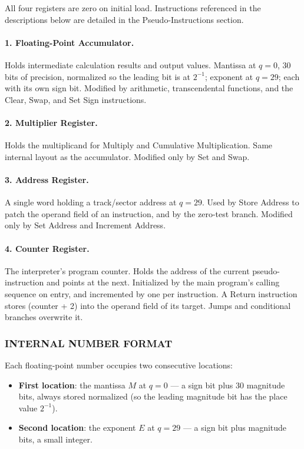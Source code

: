 All four registers are zero on initial load. Instructions referenced in the descriptions below are detailed in the Pseudo-Instructions section.

\paragraph{1. Floating-Point Accumulator.} Holds intermediate calculation results and output values. Mantissa at $q=0$, 30 bits of precision, normalized so the leading bit is at $2^{-1}$; exponent at $q=29$; each with its own sign bit. Modified by arithmetic, transcendental functions, and the Clear, Swap, and Set Sign instructions.

\paragraph{2. Multiplier Register.} Holds the multiplicand for Multiply and Cumulative Multiplication. Same internal layout as the accumulator. Modified only by Set and Swap.

\paragraph{3. Address Register.} A single word holding a track/sector address at $q=29$. Used by Store Address to patch the operand field of an instruction, and by the zero-test branch. Modified only by Set Address and Increment Address.

\paragraph{4. Counter Register.} The interpreter's program counter. Holds the address of the current pseudo-instruction and points at the next. Initialized by the main program's calling sequence on entry, and incremented by one per instruction. A Return instruction stores (counter + 2) into the operand field of its target. Jumps and conditional branches overwrite it.

\subsubsection*{INTERNAL NUMBER FORMAT}

Each floating-point number occupies two consecutive locations:
\begin{itemize}
    \item \textbf{First location}: the mantissa $M$ at $q=0$ --- a sign bit plus 30 magnitude bits, always stored normalized (so the leading magnitude bit has the place value $2^{-1}$).
    \item \textbf{Second location}: the exponent $E$ at $q=29$ --- a sign bit plus magnitude bits, a small integer.
\end{itemize}

